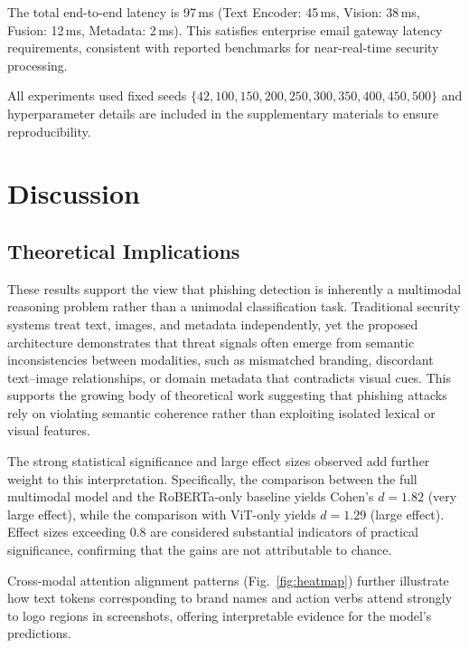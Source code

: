 \documentclass[conference]{IEEEtran}
\begin{document}
The total end-to-end latency is 97\,ms (Text Encoder: 45\,ms, Vision: 38\,ms, Fusion: 12\,ms, Metadata: 2\,ms). This satisfies enterprise email gateway latency requirements, consistent with reported benchmarks for near-real-time security processing.

All experiments used fixed seeds $\{42, 100, 150, 200, 250, 300, 350, 400, 450, 500\}$ and hyperparameter details are included in the supplementary materials to ensure reproducibility.

\section{Discussion}

\subsection{Theoretical Implications}

These results support the view that phishing detection is inherently a multimodal reasoning problem rather than a unimodal classification task. Traditional security systems treat text, images, and metadata independently, yet the proposed architecture demonstrates that threat signals often emerge from semantic inconsistencies between modalities, such as mismatched branding, discordant text--image relationships, or domain metadata that contradicts visual cues. This supports the growing body of theoretical work suggesting that phishing attacks rely on violating semantic coherence rather than exploiting isolated lexical or visual features.

The strong statistical significance and large effect sizes observed add further weight to this interpretation. Specifically, the comparison between the full multimodal model and the RoBERTa-only baseline yields Cohen's $d = 1.82$ (very large effect), while the comparison with ViT-only yields $d = 1.29$ (large effect). Effect sizes exceeding 0.8 are considered substantial indicators of practical significance, confirming that the gains are not attributable to chance.

Cross-modal attention alignment patterns (Fig.~\ref{fig:heatmap}) further illustrate how text tokens corresponding to brand names and action verbs attend strongly to logo regions in screenshots, offering interpretable evidence for the model's predictions.
\end{document}
